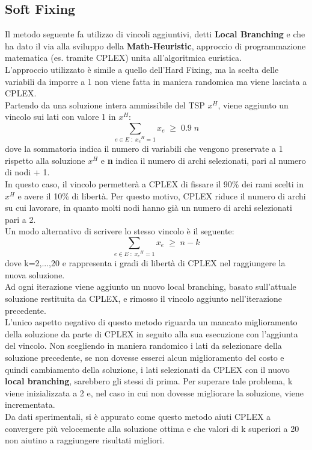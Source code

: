 \subsection{Soft Fixing}
Il metodo seguente fa utilizzo di vincoli aggiuntivi, detti \textbf{Local Branching} e che ha dato il via alla sviluppo della \textbf{Math-Heuristic}, approccio di programmazione matematica (es. tramite CPLEX) unita all'algoritmica euristica\cite{local_branching}.\\
L'approccio utilizzato è simile a quello dell'Hard Fixing, ma la scelta delle variabili da imporre a 1 non viene fatta in maniera randomica ma viene lasciata a CPLEX.\\
Partendo da una soluzione intera ammissibile del TSP $x^H$, viene aggiunto un vincolo sui lati con valore 1 in $x^H$:\\
$$\underset{e\in E\; : \; {x_e}^{H}=1}\sum{x_e}\;\geq\; 0.9\;n$$
dove la sommatoria indica il numero di variabili che vengono preservate a 1 rispetto alla soluzione $x^H$ e \textbf{n} indica il numero di archi selezionati, pari al numero di nodi + 1.\\
In questo caso, il vincolo permetterà a CPLEX di fissare il 90\% dei rami scelti in $x^H$ e avere il 10\% di libertà. Per questo motivo, CPLEX riduce il numero di archi su cui lavorare, in quanto molti nodi hanno già un numero di archi selezionati pari a 2.\\
Un modo alternativo di scrivere lo stesso vincolo è il seguente:
$$\underset{e\in E\; : \; {x_e}^{H}=1}\sum{x_e}\;\geq\; n-k$$
dove k=2,...,20 e rappresenta i gradi di libertà di CPLEX nel raggiungere la nuova soluzione.\\
Ad ogni iterazione viene aggiunto un nuovo local branching, basato sull'attuale soluzione restituita da CPLEX, e rimosso il vincolo aggiunto nell'iterazione precedente.\\
L'unico aspetto negativo di questo metodo riguarda un mancato miglioramento della soluzione da parte di CPLEX in seguito alla sua esecuzione con l'aggiunta del vincolo. Non scegliendo in maniera randomico i lati da selezionare della soluzione precedente, se non dovesse esserci alcun miglioramento del costo e quindi cambiamento della soluzione, i lati selezionati da CPLEX  con il nuovo \textbf{local branching}, sarebbero gli stessi di prima. Per superare tale problema, k viene inizializzata a 2 e, nel caso in cui non dovesse migliorare la soluzione, viene incrementata.\\
Da dati sperimentali, si è appurato come questo metodo aiuti CPLEX a convergere più velocemente alla soluzione ottima e che valori di k superiori a 20 non aiutino a raggiungere risultati migliori.\\
